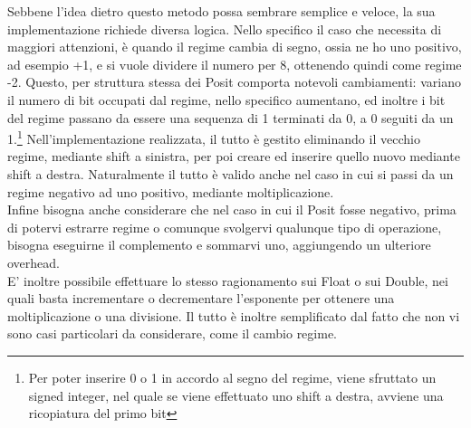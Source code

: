 \documentclass[a4paper,11pt]{article}
\begin{document}
Sebbene l'idea dietro questo metodo possa sembrare semplice e veloce, la sua implementazione richiede diversa logica. Nello specifico il caso che necessita di maggiori attenzioni, è quando il regime cambia di segno, ossia ne ho uno positivo, ad esempio +1, e si vuole dividere il numero per 8, ottenendo quindi come regime -2. Questo, per struttura stessa dei Posit comporta notevoli cambiamenti: variano il numero di bit occupati dal regime, nello specifico aumentano, ed inoltre i bit del regime passano da essere una sequenza di 1 terminati da 0, a 0 seguiti da un 1.\footnote{Per poter inserire 0 o 1 in accordo al segno del regime, viene sfruttato un signed integer, nel quale se viene effettuato uno shift a destra, avviene una ricopiatura del primo bit}
Nell'implementazione realizzata, il tutto è gestito eliminando il vecchio regime, mediante shift a sinistra, per poi creare ed inserire quello nuovo mediante shift a destra. Naturalmente il tutto è valido anche nel caso in cui si passi da un regime negativo ad uno positivo, mediante moltiplicazione.\\
Infine bisogna anche considerare che nel caso in cui il Posit fosse negativo, prima di potervi estrarre regime o comunque svolgervi qualunque tipo di operazione, bisogna eseguirne il complemento e sommarvi uno, aggiungendo un ulteriore overhead.\\
E' inoltre possibile effettuare lo stesso ragionamento sui Float o sui Double, nei quali basta incrementare o decrementare l'esponente per ottenere una moltiplicazione o una divisione. Il tutto è inoltre semplificato dal fatto che non vi sono casi particolari da considerare, come il cambio regime.
\end{document}
